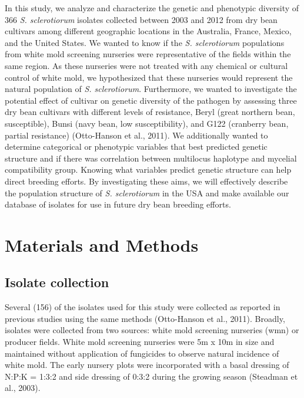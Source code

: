 \documentclass[fleqn,10pt,lineno]{wlpeerj} %
\theoremstyle{definition}
\theoremstyle{definition}
\theoremstyle{definition}
\theoremstyle{remark}
\begin{document}
In this study, we analyze and characterize the genetic and phenotypic
diversity of 366 \emph{S. sclerotiorum} isolates collected between 2003
and 2012 from dry bean cultivars among different geographic locations in
the Australia, France, Mexico, and the United States. We wanted to know
if the \emph{S. sclerotiorum} populations from white mold screening
nurseries were representative of the fields within the same region. As
these nurseries were not treated with any chemical or cultural control
of white mold, we hypothesized that these nurseries would represent the
natural population of \emph{S. sclerotiorum}. Furthermore, we wanted to
investigate the potential effect of cultivar on genetic diversity of the
pathogen by assessing three dry bean cultivars with different levels of
resistance, Beryl (great northern bean, susceptible), Bunsi (navy bean,
low susceptibility), and G122 (cranberry bean, partial resistance)
(Otto-Hanson et al., 2011). We additionally wanted to determine
categorical or phenotypic variables that best predicted genetic
structure and if there was correlation between multilocus haplotype and
mycelial compatibility group. Knowing what variables predict genetic
structure can help direct breeding efforts. By investigating these aims,
we will effectively describe the population structure of \emph{S.
sclerotiorum} in the USA and make available our database of isolates for
use in future dry bean breeding efforts.

\section*{Materials and Methods}\label{materials-and-methods}

\subsection*{Isolate collection}\label{isolate-collection}

Several (156) of the isolates used for this study were collected as
reported in previous studies using the same methods (Otto-Hanson et al.,
2011). Broadly, isolates were collected from two sources: white mold
screening nurseries (wmn) or producer fields. White mold screening
nurseries were 5m x 10m in size and maintained without application of
fungicides to observe natural incidence of white mold. The early nursery
plots were incorporated with a basal dressing of N:P:K = 1:3:2 and side
dressing of 0:3:2 during the growing season (Steadman et al., 2003).
\end{document}
